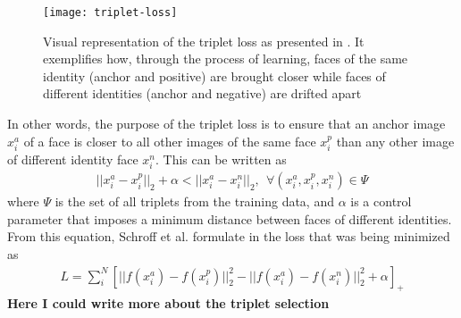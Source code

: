 \begin{figure}[h]
	\begin{center}
		\texttt{[image: triplet-loss]}
	\end{center}
	\caption[Triplet loss visualisation]{Visual representation of the triplet loss as presented in \cite{SchroffKP15}. It exemplifies how, through the process of learning, faces of the same identity (anchor and positive) are brought closer while faces of different identities (anchor and negative) are drifted apart }
\end{figure}

In other words, the purpose of the triplet loss is to ensure that an anchor image $x_{i}^{a}$ of a face is closer to all other images of the same face $x_{i}^{p}$ than any other image of different identity face $x_{i}^{n}$. This can be written as
\begin{align}
	||x_{i}^{a}  - x_{i}^{p} ||_{2} + \alpha < ||x_{i}^{a}  - x_{i}^{n} ||_{2}, \ \ \forall (x_{i}^{a}, x_{i}^{p}, x_{i}^{n}) \in \Psi
\end{align} where $\Psi$ is the set of all triplets from the training data, and $\alpha$ is a control parameter that imposes a minimum distance between faces of different identities. From this equation, Schroff et al. formulate in \cite{SchroffKP15} the loss that was being minimized as 
\begin{align}
L = \sum_{i}^{N} [||f(x_{i}^{a}) - f(x_{i}^{p})||_{2}^{2} - ||f(x_i^a) - f(x_i^n)||_{2}^{2} + \alpha]_{+}
\end{align}
\textbf{Here I could write more about the triplet selection}

